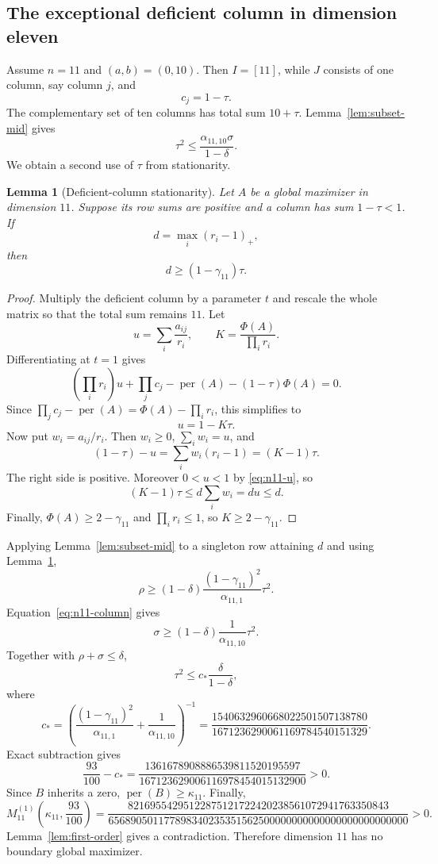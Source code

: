 \documentclass[11pt]{article}
\newtheorem{lemma}[theorem]{Lemma}
\theoremstyle{definition}
\newcommand{\per}{\operatorname{per}}
\newcommand{\1}{\mathbf{1}}
\begin{document}
\subsection{The exceptional deficient column in dimension eleven}

Assume $n=11$ and $(a,b)=(0,10)$.  Then $I=[11]$, while $J$ consists of one column, say column $j$, and
\[
 c_j=1-\tau.
 \tag{6.5}\label{eq:deficient-column}
\]
The complementary set of ten columns has total sum $10+\tau$.  Lemma~\ref{lem:subset-mid} gives
\[
 \tau^2\le\frac{\alpha_{11,10}\sigma}{1-\delta}.
 \tag{6.6}\label{eq:n11-column}
\]
We obtain a second use of $\tau$ from stationarity.

\begin{lemma}[Deficient-column stationarity]\label{lem:n11-stationarity}
Let $A$ be a global maximizer in dimension $11$.  Suppose its row sums are positive and a column has sum $1-\tau<1$.  If
\[
 d=\max_i(r_i-1)_+,
\]
then
\[
 d\ge(1-\gamma_{11})\tau.
 \tag{6.7}\label{eq:n11-d}
\]
\end{lemma}

\begin{proof}
Multiply the deficient column by a parameter $t$ and rescale the whole matrix so that the total sum remains $11$.  Let
\[
 u=\sum_i\frac{a_{ij}}{r_i},
 \qquad
 K=\frac{\Phi(A)}{\prod_i r_i}.
\]
Differentiating at $t=1$ gives
\[
 \left(\prod_i r_i\right)u
 +\prod_jc_j-\per(A)
 -(1-\tau)\Phi(A)=0.
\]
Since $\prod_jc_j-\per(A)=\Phi(A)-\prod_i r_i$, this simplifies to
\[
 u=1-K\tau.
 \tag{6.8}\label{eq:n11-u}
\]
Now put $w_i=a_{ij}/r_i$.  Then $w_i\ge0$, $\sum_iw_i=u$, and
\[
 (1-\tau)-u
 =\sum_iw_i(r_i-1)
 =(K-1)\tau.
\]
The right side is positive.  Moreover $0<u<1$ by \eqref{eq:n11-u}, so
\[
 (K-1)\tau
 \le d\sum_iw_i
 =du\le d.
\]
Finally, $\Phi(A)\ge2-\gamma_{11}$ and $\prod_i r_i\le1$, so $K\ge2-\gamma_{11}$.
\end{proof}

Applying Lemma~\ref{lem:subset-mid} to a singleton row attaining $d$ and using Lemma~\ref{lem:n11-stationarity},
\[
 \rho\ge
 (1-\delta)\frac{(1-\gamma_{11})^2}{\alpha_{11,1}}\tau^2.
 \tag{6.9}\label{eq:n11-rho}
\]
Equation~\eqref{eq:n11-column} gives
\[
 \sigma\ge
 (1-\delta)\frac1{\alpha_{11,10}}\tau^2.
 \tag{6.10}\label{eq:n11-sigma}
\]
Together with $\rho+\sigma\le\delta$,
\[
 \tau^2\le c_*\frac{\delta}{1-\delta},
 \tag{6.11}\label{eq:n11-cstar-bound}
\]
where
\[
 c_*=
 \left(
 \frac{(1-\gamma_{11})^2}{\alpha_{11,1}}
 +\frac1{\alpha_{11,10}}
 \right)^{-1}
 =\frac{1540632960668022501507138780}
 {1671236290061169784540151329}.
 \tag{6.12}\label{eq:n11-cstar}
\]
Exact subtraction gives
\[
 \frac{93}{100}-c_*
 =\frac{1361678908886539811520195597}
 {167123629006116978454015132900}>0.
 \tag{6.13}\label{eq:n11-cstar-gap}
\]
Since $B$ inherits a zero, $\per(B)\ge\kappa_{11}$.  Finally,
\[
 M_{11}^{(1)}\left(\kappa_{11},\frac{93}{100}\right)
 =\frac{82169554295122875121722420238561072941763350843}
 {656890501177898340235351562500000000000000000000000000}>0.
 \tag{6.14}\label{eq:n11-special-margin}
\]
Lemma~\ref{lem:first-order} gives a contradiction.  Therefore dimension $11$ has no boundary global maximizer.
\end{document}
